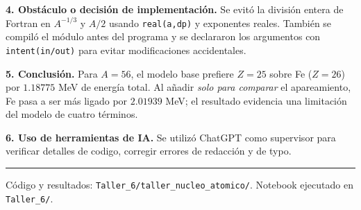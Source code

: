 \documentclass[11pt]{article}
\begin{document}
\textbf{4. Obstáculo o decisión de implementación.} Se evitó la división entera de Fortran en $A^{-1/3}$ y $A/2$ usando \texttt{real(a,dp)} y exponentes reales. También se compiló el módulo antes del programa y se declararon los argumentos con \texttt{intent(in/out)} para evitar modificaciones accidentales.

\textbf{5. Conclusión.} Para $A=56$, el modelo base prefiere $Z=25$ sobre Fe ($Z=26$) por $1.18775$ MeV de energía total. Al añadir \emph{solo para comparar} el apareamiento, Fe pasa a ser más ligado por $2.01939$ MeV; el resultado evidencia una limitación del modelo de cuatro términos.

\textbf{6. Uso de herramientas de IA.} Se utilizó ChatGPT como supervisor para verificar detalles de codigo, corregir errores de redacción y de typo.

\vspace{2pt}\hrule\vspace{3pt}
{\footnotesize Código y resultados: \texttt{Taller\_6/taller\_nucleo\_atomico/}. Notebook ejecutado en \texttt{Taller\_6/}.}
\end{document}
